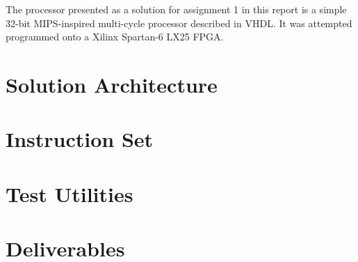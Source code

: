 The processor presented as a solution for assignment 1 in this report is a simple 32-bit MIPS-inspired multi-cycle processor described in VHDL.
It was attempted programmed onto a Xilinx Spartan-6 LX25 FPGA.

\section{Solution Architecture}



\section{Instruction Set}
\label{section:instruction-set}

 \label{sec:instruction-set}

\section{Test Utilities}



\section{Deliverables}


